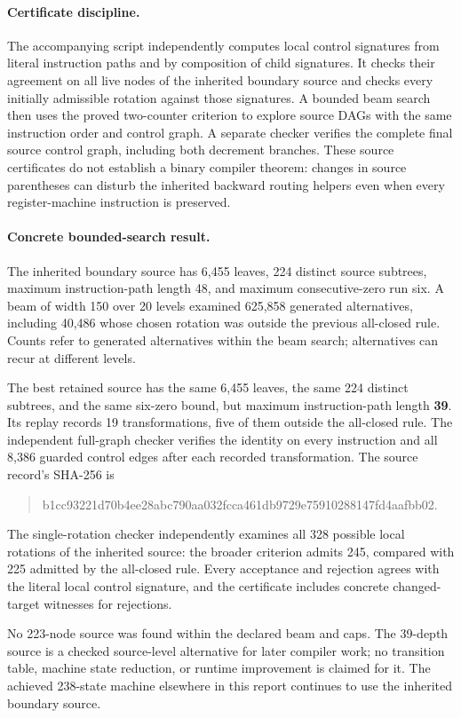 \paragraph{Certificate discipline.}
The accompanying script independently computes local control signatures
from literal instruction paths and by composition of child signatures.
It checks their agreement on all live nodes of the inherited boundary
source and checks every initially admissible rotation against those
signatures.  A bounded beam search then uses the proved two-counter
criterion to explore source DAGs with the same instruction order and
control graph.  A separate checker verifies the complete final source
control graph, including both decrement branches.  These source
certificates do not establish a binary compiler theorem: changes in
source parentheses can disturb the inherited backward routing helpers
even when every register-machine instruction is preserved.

\paragraph{Concrete bounded-search result.}
The inherited boundary source has 6,455 leaves, 224 distinct source
subtrees, maximum instruction-path length 48, and maximum consecutive-zero
run six.  A beam of width 150 over 20 levels examined 625,858 generated
alternatives, including 40,486 whose chosen rotation was outside the
previous all-closed rule.  Counts refer to generated alternatives within
the beam search; alternatives can recur at different levels.

The best retained source has the same 6,455 leaves, the same 224 distinct
subtrees, and the same six-zero bound, but maximum instruction-path length
\textbf{39}.  Its replay records 19 transformations, five of them outside
the all-closed rule.  The independent full-graph checker verifies the
identity on every instruction and all 8,386 guarded control edges after
each recorded transformation.  The source record's SHA-256 is
\begin{quote}\small\ttfamily
b1cc93221d70b4ee28abc790aa032fcca461db9729e75910288147fd4aafbb02.
\end{quote}
The single-rotation checker independently examines all 328 possible local
rotations of the inherited source: the broader criterion admits 245,
compared with 225 admitted by the all-closed rule.  Every acceptance and
rejection agrees with the literal local control signature, and the
certificate includes concrete changed-target witnesses for rejections.

No 223-node source was found within the declared beam and caps.  The
39-depth source is a checked source-level alternative for later compiler
work; no transition table, machine state reduction, or runtime improvement
is claimed for it.  The achieved 238-state machine elsewhere in this
report continues to use the inherited boundary source.
